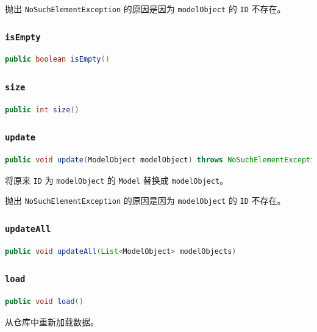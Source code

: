 \documentclass[hyperref,UTF8,12pt,a4paper]{ctexart}
\begin{document}
抛出 \texttt{NoSuchElementException} 的原因是因为 \texttt{modelObject} 的 \texttt{ID} 不存在。

\subsubsection{\texttt{isEmpty}}
\begin{lstlisting}[language=Java]
    public boolean isEmpty()
\end{lstlisting}

\subsubsection{\texttt{size}}

\begin{lstlisting}[language=Java]
	public int size()
\end{lstlisting}

\subsubsection{\texttt{update}}

\begin{lstlisting}[language=Java]
	public void update(ModelObject modelObject) throws NoSuchElementException
\end{lstlisting}

将原来 \texttt{ID} 为 \texttt{modelObject} 的 \texttt{Model} 替换成 \texttt{modelObject}。

抛出 \texttt{NoSuchElementException} 的原因是因为 \texttt{modelObject} 的 \texttt{ID} 不存在。

\subsubsection{\texttt{updateAll}}

\begin{lstlisting}[language=Java]
	public void updateAll(List<ModelObject> modelObjects)
\end{lstlisting}

\subsubsection{\texttt{load}}

\begin{lstlisting}[language=Java]
	public void load()
\end{lstlisting}

从仓库中重新加载数据。
\end{document}
